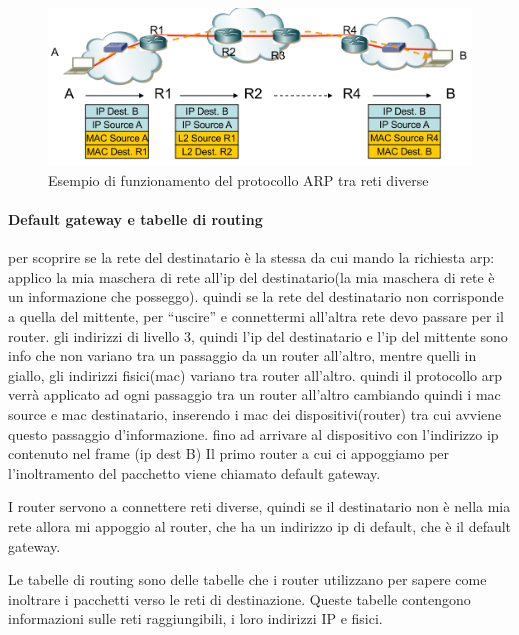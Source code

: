 \begin{figure}[h!]
    \centering
    \includegraphics[width=1\textwidth]{images/esempioARPretidiverse.png}
    \caption{Esempio di funzionamento del protocollo ARP tra reti diverse}
    \label{fig:esempioARPretidiverse}
\end{figure}

\paragraph{Default gateway e tabelle di routing}

per scoprire se la rete del destinatario è la stessa da cui mando la richiesta arp: applico la mia maschera di rete all’ip del destinatario(la mia maschera di rete è un informazione che posseggo). quindi se la rete del destinatario non corrisponde a quella del mittente, per “uscire” e connettermi all’altra rete devo passare per il router. gli indirizzi di livello 3, quindi l’ip del destinatario e l’ip del mittente sono info che non variano tra un passaggio da un router all’altro, mentre quelli in giallo, gli indirizzi fisici(mac) variano tra router all’altro.
quindi il protocollo arp verrà applicato ad ogni passaggio tra un router all'altro cambiando quindi i mac source e mac destinatario, inserendo i mac dei dispositivi(router) tra cui avviene questo passaggio d’informazione. fino ad arrivare al dispositivo con l’indirizzo ip contenuto nel frame (ip dest B)
Il primo router a cui ci appoggiamo per l'inoltramento del pacchetto viene chiamato default gateway.

I router servono a connettere reti diverse, quindi se il destinatario non è nella mia rete allora mi appoggio al router, che ha un indirizzo ip di default, che è il default gateway.

Le tabelle di routing sono delle tabelle che i router utilizzano per sapere come inoltrare i pacchetti verso le reti di destinazione. Queste tabelle contengono informazioni sulle reti raggiungibili, i loro indirizzi IP e fisici.

